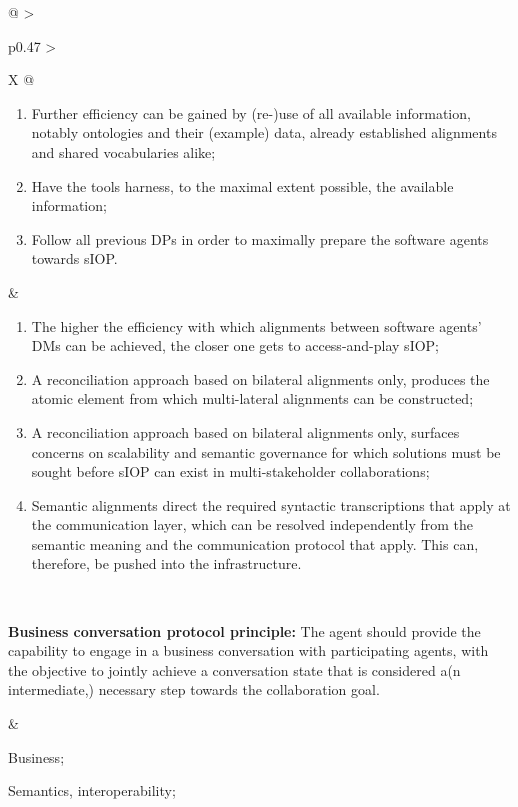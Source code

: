 \begin{xltabular}[l]{\linewidth}{@{} >{\small\raggedright\arraybackslash}p{0.47\linewidth} >{\small\raggedright\arraybackslash}X @{}}
\begin{enumerate}[left=6pt, nosep]
  \item Further efficiency can be gained by (re-)use of all available information, notably ontologies and their (example) data, already established alignments and shared vocabularies alike;
  \item Have the tools harness, to the maximal extent possible, the available information;
  \item Follow all previous DPs in order to maximally prepare the software agents towards sIOP.
\end{enumerate}
&
\begin{enumerate}[left=10pt, nosep]
  \item The higher the efficiency with which alignments between software agents' DMs can be achieved, the closer one gets to access-and-play sIOP;
  \item A reconciliation approach based on bilateral alignments only, produces the atomic element from which multi-lateral alignments can be constructed;
  \item A reconciliation approach based on bilateral alignments only, surfaces concerns on scalability and semantic governance for which solutions must be sought before sIOP can exist in multi-stakeholder collaborations;
  \item Semantic alignments direct the required syntactic transcriptions that apply at the communication layer, which can be resolved independently from the semantic meaning and the communication protocol that apply. This can, therefore, be pushed into the infrastructure.
\end{enumerate} \\
%
%
%
\begin{mmdp}\label{dp:bcpp}{\bfseries Business conversation protocol principle:}
\quad The agent should provide the capability to engage in a business conversation with participating agents, with the objective to jointly achieve a conversation state that is considered a(n intermediate,) necessary step towards the collaboration goal.
\end{mmdp}
&
\begin{description}[labelwidth=3.7cm,leftmargin=3.7cm+1ex,nosep,topsep=2ex,labelsep=1ex,font=\bfseries]
  \item[Type of information:] Business;
  \item[Quality attributes:] Semantics, interoperability;
\end{description} \\

\end{xltabular}

